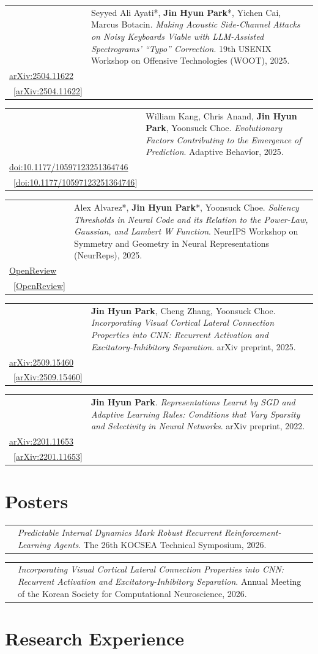 \documentclass[10pt,letterpaper]{article}
\makeatletter
\newcommand{\pub}[5]{%
  \par\vspace{4pt}%
  \begin{tabularx}{\textwidth}{@{}p{2.9em}@{}X@{}}
    \makebox[2.6em][c]{\textcolor{accent}{[#1]}} & #2. \emph{#3}. #4.\ifx\\#5\\\else\ [#5]\fi\\
  \end{tabularx}}
\newcommand{\poster}[3]{%
  \par\vspace{4pt}%
  \begin{tabularx}{\textwidth}{@{}p{2.9em}@{}X@{}}
    \makebox[2.6em][c]{\textcolor{accent}{[#1]}} & \emph{#2}. #3.\\
  \end{tabularx}}
\newcommand{\me}{\textbf{Jin Hyun Park}}
\makeatother
\begin{document}
\pub{C1}{Seyyed Ali Ayati*, \me*, Yichen Cai, Marcus Botacin}
    {Making Acoustic Side-Channel Attacks on Noisy Keyboards Viable with LLM-Assisted Spectrograms' ``Typo'' Correction}
    {19th USENIX Workshop on Offensive Technologies (WOOT), 2025}
    {\href{https://arxiv.org/abs/2504.11622}{arXiv:2504.11622}}

\pub{J1}{William Kang, Chris Anand, \me, Yoonsuck Choe}
    {Evolutionary Factors Contributing to the Emergence of Prediction}
    {Adaptive Behavior, 2025}
    {\href{https://journals.sagepub.com/doi/10.1177/10597123251364746}{doi:10.1177/10597123251364746}}

\pub{W1}{Alex Alvarez*, \me*, Yoonsuck Choe}
    {Saliency Thresholds in Neural Code and its Relation to the Power-Law, Gaussian, and Lambert W Function}
    {NeurIPS Workshop on Symmetry and Geometry in Neural Representations (NeurReps), 2025}
    {\href{https://openreview.net/forum?id=cjo2oadaRz}{OpenReview}}

\pub{A2}{\me, Cheng Zhang, Yoonsuck Choe}
    {Incorporating Visual Cortical Lateral Connection Properties into CNN: Recurrent Activation and Excitatory-Inhibitory Separation}
    {arXiv preprint, 2025}
    {\href{https://arxiv.org/abs/2509.15460}{arXiv:2509.15460}}

\pub{A1}{\me}
    {Representations Learnt by SGD and Adaptive Learning Rules: Conditions that Vary Sparsity and Selectivity in Neural Networks}
    {arXiv preprint, 2022}
    {\href{https://arxiv.org/abs/2201.11653}{arXiv:2201.11653}}

\section{Posters}

\poster{P2}{Predictable Internal Dynamics Mark Robust Recurrent Reinforcement-Learning Agents}
    {The 26th KOCSEA Technical Symposium, 2026}

\poster{P1}{Incorporating Visual Cortical Lateral Connection Properties into CNN: Recurrent Activation and Excitatory-Inhibitory Separation}
    {Annual Meeting of the Korean Society for Computational Neuroscience, 2026}

\section{Research Experience}
\end{document}
